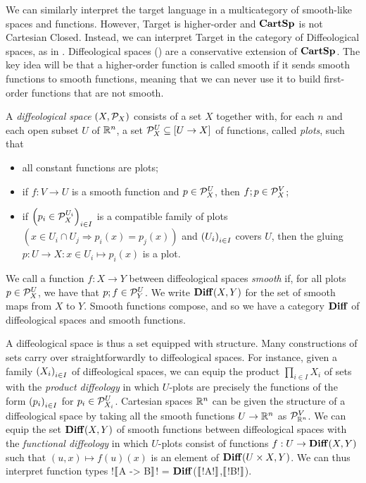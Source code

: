 We can similarly interpret the target language in a multicategory of smooth-like spaces and functions. 
However, Target is higher-order and $\CartSp$ is not Cartesian Closed. 
Instead, we can interpret Target in the category of Diffeological spaces, 
as in \cite{huot2020correctness}. 
Diffeological spaces (\cite{iglesias2013diffeology}) are a conservative extension of $\CartSp$. 
The key idea will be that a higher-order function is called smooth if it sends smooth functions to smooth functions, meaning that we can never use it
to build first-order functions that are not smooth.

\begin{definition}
	A \emph{diffeological space} $(X,\plots{X})$ consists of a set $X$ together with, for each $n$ and each open subset $U$ of $\RR^n$,  a set $\plots{X}^U\subseteq [U\to X]$ of functions, called \emph{plots}, such that
	\begin{itemize}
	 	\item all constant functions are plots;
	 	\item if $f:V\to U$ is a smooth function and $p\in\plots{X}^U$, then $f;p\in\plots{X}^V$;
     \item if $\seq[i\in I]{p_i\in\plots{X}^{U_i}}$ is a compatible family of plots $(x\in U_i\cap U_j\Rightarrow p_i(x)=p_j(x))$
     and $\seq[i\in I]{U_i}$ covers $U$,
     then the gluing $p:U\to X:x\in U_i\mapsto p_i(x)$ is a plot.
	 \end{itemize} 
\end{definition}
We call a function $f:X\to Y$ between diffeological spaces \emph{smooth} if, for all plots
$p\in\plots{X}^U$, we have that $p;f\in \plots{Y}^U$. We write $\Diff(X,Y)$ for the set of smooth maps from $X$ to $Y$. 
Smooth functions compose, and so we have a category $\Diff$ of diffeological spaces and smooth functions.

A diffeological space is thus a set equipped with structure.
Many constructions of sets carry over straightforwardly to diffeological spaces.
For instance, given a family $\seq[i\in I]{X_i}$ of diffeological spaces,
we can equip the product $\prod_{i\in I}X_i$ of sets with the
\emph{product diffeology} in which $U$-plots are precisely the functions
of the form $\seq[i\in I]{p_i}$ for $p_i\in\plots{X_i}^U$.  
Cartesian spaces $\RR^n$ can be given the structure of a diffeological space by taking all the
smooth functions $U\to \RR^n$ as $\plots{\RR^n}^V$. We can equip the set $\Diff(X,Y)$ of smooth functions between diffeological spaces with the \emph{functional diffeology}
in which $U$-plots consist of functions $f:U\to \Diff(X,Y)$ such that 
$(u,x)\mapsto f(u)(x)$ is an element of $\Diff(U\times X, Y)$.
We can thus interpret function types !$\seml$A -> B$\semr$! = $\Diff$($\seml$!A!$\semr$,$\seml$!B!$\semr$).


